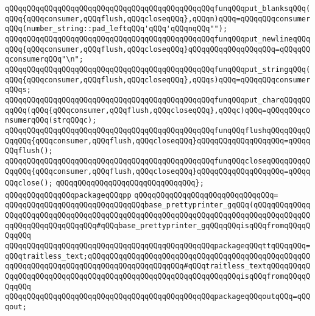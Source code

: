 \newline
\verb|qQQqqQQqqQQqqQQqqQQqqQQqqQQqqQQqqQQqqQQqqQQqqQQqfunqQQqput_blanksqQQq(qQQq{qQQqconsumer,qQQqflush,qQQqcloseqQQq},qQQqn)qQQq=qQQqqQQqconsumerqQQq(number_string::pad_leftqQQq'qQQq'qQQqnqQQq"");|\newline
\verb|qQQqqQQqqQQqqQQqqQQqqQQqqQQqqQQqqQQqqQQqqQQqqQQqfunqQQqput_newlineqQQqqQQq{qQQqconsumer,qQQqflush,qQQqcloseqQQq}qQQqqQQqqQQqqQQqqQQq=qQQqqQQqconsumerqQQq"\n";|\newline
\verb|qQQqqQQqqQQqqQQqqQQqqQQqqQQqqQQqqQQqqQQqqQQqqQQqfunqQQqput_stringqQQq(qQQq{qQQqconsumer,qQQqflush,qQQqcloseqQQq},qQQqs)qQQq=qQQqqQQqconsumerqQQqs;|\newline
\verb|qQQqqQQqqQQqqQQqqQQqqQQqqQQqqQQqqQQqqQQqqQQqqQQqfunqQQqput_charqQQqqQQqqQQq(qQQq{qQQqconsumer,qQQqflush,qQQqcloseqQQq},qQQqc)qQQq=qQQqqQQqconsumerqQQq(strqQQqc);|\newline
\newline
\verb|qQQqqQQqqQQqqQQqqQQqqQQqqQQqqQQqqQQqqQQqqQQqqQQqfunqQQqflushqQQqqQQqqQQqqQQq{qQQqconsumer,qQQqflush,qQQqcloseqQQq}qQQqqQQqqQQqqQQqqQQq=qQQqqQQqflush();|\newline
\verb|qQQqqQQqqQQqqQQqqQQqqQQqqQQqqQQqqQQqqQQqqQQqqQQqfunqQQqcloseqQQqqQQqqQQqqQQq{qQQqconsumer,qQQqflush,qQQqcloseqQQq}qQQqqQQqqQQqqQQqqQQq=qQQqqQQqclose();|\newline
\verb|qQQqqQQqqQQqqQQqqQQqqQQqqQQqqQQq};|\newline
\newline
\verb|qQQqqQQqqQQqqQQqpackageqQQqpp|\newline
\verb|qQQqqQQqqQQqqQQqqQQqqQQqqQQqqQQq=|\newline
\verb|qQQqqQQqqQQqqQQqqQQqqQQqqQQqqQQqbase_prettyprinter_gqQQq(qQQqqQQqqQQqqQQqqQQqqQQqqQQqqQQqqQQqqQQqqQQqqQQqqQQqqQQqqQQqqQQqqQQqqQQqqQQqqQQqqQQqqQQqqQQqqQQqqQQqqQQq#qQQqbase_prettyprinter_gqQQqqQQqisqQQqfromqQQqqQQqqQQq|\newline
\verb|qQQqqQQqqQQqqQQqqQQqqQQqqQQqqQQqqQQqqQQqqQQqqQQqpackageqQQqttqQQqqQQq=qQQqtraitless_text;qQQqqQQqqQQqqQQqqQQqqQQqqQQqqQQqqQQqqQQqqQQqqQQqqQQqqQQqqQQqqQQqqQQqqQQqqQQqqQQqqQQqqQQqqQQq#qQQqtraitless_textqQQqqQQqqQQqqQQqqQQqqQQqqQQqqQQqqQQqqQQqqQQqqQQqqQQqqQQqqQQqqQQqisqQQqfromqQQqqQQqqQQq|\newline
\verb|qQQqqQQqqQQqqQQqqQQqqQQqqQQqqQQqqQQqqQQqqQQqqQQqpackageqQQqoutqQQq=qQQqout;|\newline
